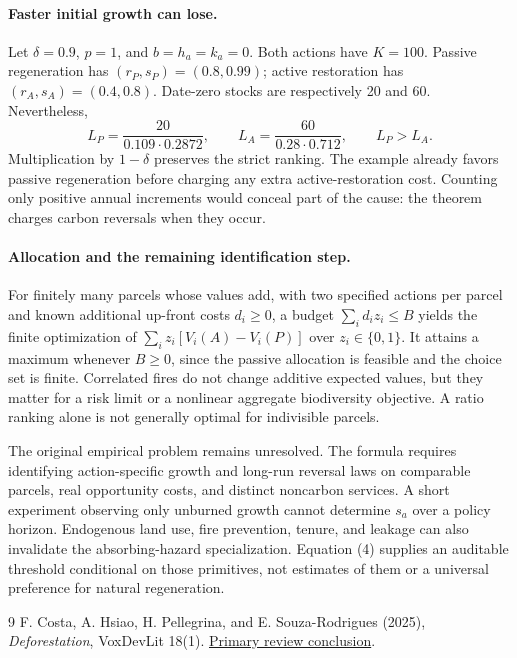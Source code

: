 \documentclass[11pt]{article}
\theoremstyle{definition}
\begin{document}
\paragraph{Faster initial growth can lose.}
Let $\delta=0.9$, $p=1$, and $b=h_a=k_a=0$. Both actions have $K=100$. Passive regeneration has $(r_P,s_P)=(0.8,0.99)$; active restoration has $(r_A,s_A)=(0.4,0.8)$. Date-zero stocks are respectively 20 and 60. Nevertheless,
\[
 L_P=\frac{20}{0.109\cdot0.2872},\qquad
 L_A=\frac{60}{0.28\cdot0.712},\qquad L_P>L_A.
\]
Multiplication by $1-\delta$ preserves the strict ranking. The example already favors passive regeneration before charging any extra active-restoration cost. Counting only positive annual increments would conceal part of the cause: the theorem charges carbon reversals when they occur.

\paragraph{Allocation and the remaining identification step.}
For finitely many parcels whose values add, with two specified actions per parcel and known additional up-front costs $d_i\geq0$, a budget $\sum_i d_i z_i\leq B$ yields the finite optimization of $\sum_i z_i[V_i(A)-V_i(P)]$ over $z_i\in\{0,1\}$. It attains a maximum whenever $B\geq0$, since the passive allocation is feasible and the choice set is finite. Correlated fires do not change additive expected values, but they matter for a risk limit or a nonlinear aggregate biodiversity objective. A ratio ranking alone is not generally optimal for indivisible parcels.

The original empirical problem remains unresolved. The formula requires identifying action-specific growth and long-run reversal laws on comparable parcels, real opportunity costs, and distinct noncarbon services. A short experiment observing only unburned growth cannot determine $s_a$ over a policy horizon. Endogenous land use, fire prevention, tenure, and leakage can also invalidate the absorbing-hazard specialization. Equation (4) supplies an auditable threshold conditional on those primitives, not estimates of them or a universal preference for natural regeneration.

\begin{thebibliography}{9}
 F. Costa, A. Hsiao, H. Pellegrina, and E. Souza-Rodrigues (2025), \emph{Deforestation}, VoxDevLit 18(1). \href{https://voxdev.org/voxdevlit/deforestation/conclusion-and-evidence-gaps}{Primary review conclusion}.
\end{thebibliography}
\end{document}
